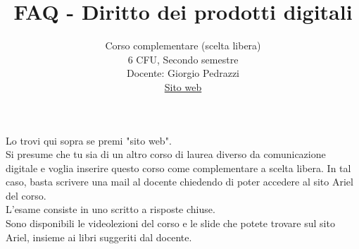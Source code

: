 \documentclass{article}
\title{FAQ - \textbf{Diritto dei prodotti digitali}}
\author{
	Corso complementare (scelta libera)\\6 CFU, Secondo semestre\\
	Docente: Giorgio Pedrazzi\\ 
	\href{https://gpedrazzidpd.ariel.ctu.unimi.it/v5/home/default.aspx/}{Sito web}
	\date{}
}
\begin{document}
 
	\maketitle
	
	\begin{enumerate}
		
		\rmfamily
		Lo trovi qui sopra se premi "sito web".\\
		
		Si presume che tu sia di un altro corso di laurea diverso da comunicazione digitale e voglia inserire
		questo corso come complementare a scelta libera. In tal caso, basta scrivere una mail al docente chiedendo 
		di poter accedere al sito Ariel del corso.\\
		
		L'esame consiste in uno scritto a risposte chiuse.\\
		
		Sono disponibili le videolezioni del corso e le slide che potete trovare sul sito Ariel, 
		insieme ai libri suggeriti dal docente.\\
		
	\end{enumerate}
	
\end{document}
